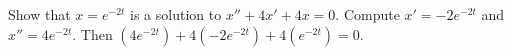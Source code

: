 {Show that $x = e^{-2t}$ is a solution to $x'' + 4x' + 4x = 0$.}
{Compute $x' = -2e^{-2t}$ and $x'' = 4e^{-2t}$.  Then
$(4e^{-2t}) + 4 (-2e^{-2t}) + 4 (e^{-2t}) = 0$.}